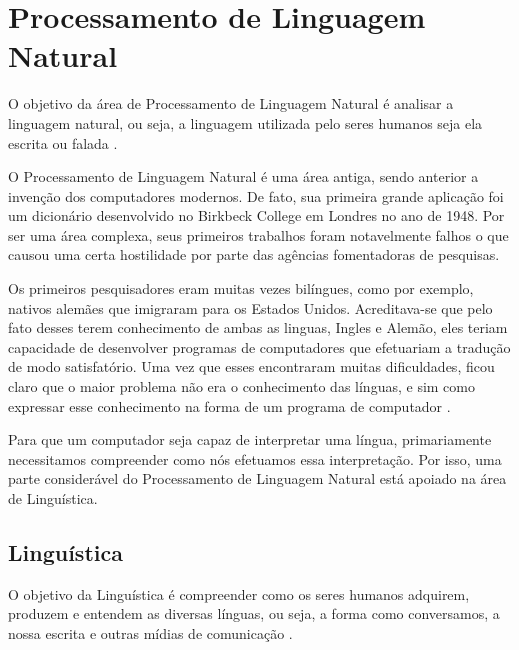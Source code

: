 \chapter{Processamento de Linguagem Natural}
\label{cap:Processamento}


O objetivo da área de Processamento de Linguagem Natural é analisar a linguagem
natural, ou seja, a linguagem utilizada pelo seres humanos seja ela escrita
ou falada \cite{manningschutze1999}.

O Processamento de Linguagem Natural é uma área antiga, sendo anterior a
invenção dos computadores modernos. De fato, sua primeira grande aplicação foi
um dicionário desenvolvido no Birkbeck College em Londres no ano de 1948. Por ser
uma área complexa, seus primeiros trabalhos foram notavelmente falhos o que
causou uma certa hostilidade por parte das agências fomentadoras de pesquisas.

Os primeiros pesquisadores eram muitas vezes bilíngues, como por exemplo,
nativos alemães que imigraram para os Estados Unidos. Acreditava-se que pelo
fato desses terem conhecimento de ambas as linguas, Ingles e Alemão, eles teriam
capacidade de desenvolver programas de computadores que efetuariam a tradução
de modo satisfatório. Uma vez que esses encontraram muitas dificuldades,
ficou claro que o maior problema não era o conhecimento das
línguas, e sim como expressar esse conhecimento na forma de um programa de
computador \cite{history}.

Para que um computador seja capaz de interpretar uma
língua, primariamente necessitamos compreender como nós efetuamos essa
interpretação.
Por isso, uma parte considerável do Processamento de Linguagem Natural está apoiado na área de Linguística.

\section{Linguística}

O objetivo da Linguística é compreender como os seres humanos adquirem, produzem
e entendem as diversas línguas, ou seja, a forma como conversamos, a nossa
escrita e outras mídias de comunicação \cite{manningschutze1999}.

